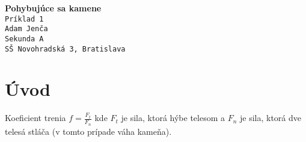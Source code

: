 \documentclass{article}
\begin{document}
\begin{center}
	\huge \textbf{Pohybujúce sa kamene}\\
	\large \texttt{Príklad 1}\\
	\large \texttt{Adam Jenča}\\
	\large \texttt{Sekunda A}\\
	\large \texttt{SŠ Novohradská 3, Bratislava}\\
\end{center}
\section{Úvod}
Koeficient trenia $f = \frac{F_t}{F_n}$ kde $F_t$ je sila, ktorá hýbe telesom a $F_n$ je sila, ktorá dve telesá stláča (v tomto prípade váha kameňa).
\end{document}

